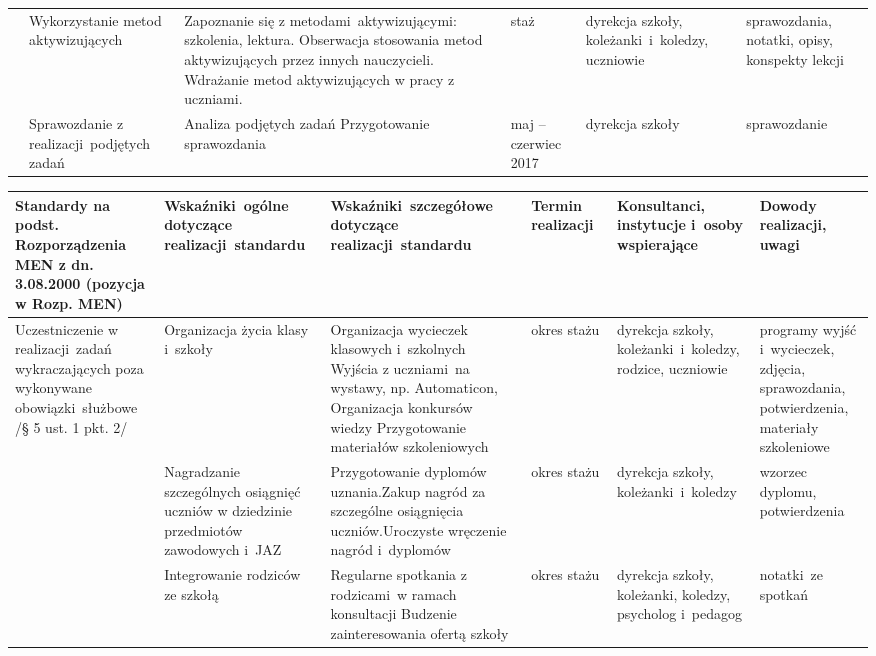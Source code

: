\documentclass[a4paper,titlepage,13pt,draft]{mwart}
\begin{document}
\begin{tabular}{ | p{2.4cm} | p{2.5cm} | p{5cm} | p{1.4cm} | p{2cm} | p{2.1cm} |}
& Wykorzystanie metod aktywizujących & Zapoznanie się z metodami~aktywizującymi: szkolenia, lektura.\newline
Obserwacja stosowania metod aktywizujących przez innych nauczycieli.\newline
Wdrażanie metod aktywizujących w pracy z uczniami. & staż & dyrekcja szkoły, koleżanki~i~koledzy, uczniowie & sprawozda\-nia, notatki, opisy, konspekty lekcji~\\ \cline{2-6}
& Sprawozdanie z realizacji~podjętych zadań & Analiza podjętych zadań\newline
Przygoto\-wa\-nie sprawozdania & maj -- czerwiec 2017 & dyrekcja szkoły & sprawozdanie \\ \hline
\end{tabular}
\newpage
\begin{tabular}{ | p{2.4cm} | p{2.5cm} | p{5cm} | p{1.4cm} | p{2cm} | p{2.1cm} |}
\hline
Standardy na podst. Rozporządzenia MEN z dn. 3.08.2000 (pozycja w Rozp. MEN) & Wskaźniki~ogólne dotyczące realizacji~standardu & Wskaźniki~szczegółowe dotyczące realizacji~standardu & Termin realizacji~& Konsultanci, instytucje i~osoby wspierające & Dowody realizacji, uwagi~\\ \hline \hline
\multiline{Uczestniczenie w realizacji~zadań wykraczających poza wykonywane obowiązki~służbowe\newline
/§ 5 ust. 1 pkt. 2/}&Organizacja życia klasy i~szkoły&Organizacja wycieczek klasowych i~szkolnych\newline
Wyjścia z uczniami~na wystawy, np. Automaticon,\newline
Organizacja konkursów wiedzy\newline
Przygotowanie materiałów szkoleniowych&okres stażu&dyrekcja szkoły, koleżanki~i~koledzy, rodzice, uczniowie&
programy wyjść i~wycieczek, zdjęcia, sprawozda\-nia, potwierdzenia, materiały szkoleniowe\\ \cline{2-6}
&Nagradzanie szczególnych osiągnięć uczniów w dziedzinie przedmiotów zawodowych i~JAZ& Przygotowanie dyplomów uznania.\newline Zakup nagród za szczególne osiągnięcia uczniów.\newline Uroczyste wręczenie nagród i~dyplomów&okres stażu&dyrekcja szkoły, koleżanki~i~koledzy&wzorzec dyplomu, potwierdzenia\\ \cline{2-6}
&Integrowanie rodziców ze szkołą&Regularne spotkania z rodzicami~w ramach konsultacji\newline
Budzenie zainteresowania ofertą szkoły&okres stażu&dyrekcja szkoły, koleżanki, koledzy, psycholog i~pedagog&notatki~ze spotkań\\ \cline{2-6}

\end{tabular}
\end{document}
